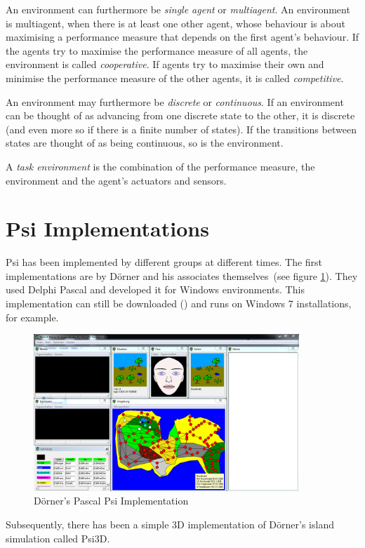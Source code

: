 An environment can furthermore be \emph{single agent} or \emph{multiagent}. An environment is multiagent, when there is at least one other agent, whose behaviour is about maximising a performance measure that depends on the first agent's behaviour. If the agents try to maximise the performance measure of all agents, the environment is called \emph{cooperative}. If agents try to maximise their own and minimise the performance measure of the other agents, it is called \emph{competitive}.

An environment may furthermore be \emph{discrete} or \emph{continuous}. If an environment can be thought of as advancing from one discrete state to the other, it is discrete (and even more so if there is a finite number of states). If the transitions between states are thought of as being continuous, so is the environment.

A \emph{task environment} is the combination of the performance measure, the environment and the agent's actuators and sensors.

    \section{Psi Implementations}
Psi has been implemented by different groups at different times. The first implementations are by Dörner and his associates themselves~(see figure \ref{psi_screen}). They used Delphi Pascal and developed it for Windows environments. This implementation can still be downloaded (\cite{PsiDownload}) and runs on Windows 7 installations, for example. 

\begin{figure}[h]
  \centering
    \includegraphics[width=10cm]{graphics/psi_screen1}
  \caption{Dörner's Pascal Psi Implementation}
  \label{psi_screen}
\end{figure}

Subsequently, there has been a simple 3D implementation of Dörner's island simulation called Psi3D.

